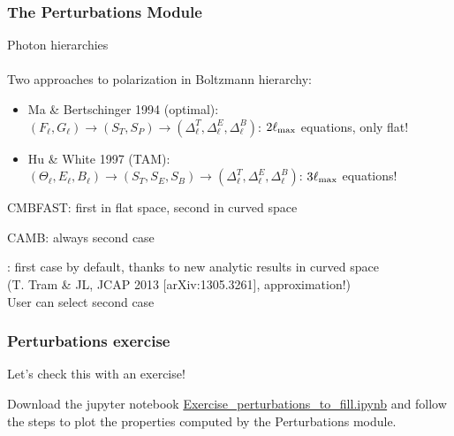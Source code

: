 \begin{frame}[fragile]
\frametitle{The Perturbations Module}

Photon hierarchies\\
\mbox{}\\
Two approaches to polarization in Boltzmann hierarchy:
\begin{itemize}
	\item Ma \& Bertschinger 1994 (optimal):\\$(F_\ell, G_\ell) \rightarrow (S_T, S_P)  \rightarrow (\Delta_\ell^T, \Delta_\ell^E, \Delta_\ell^B)$: $2 \ell_{\rm max}$ equations, only flat!
	\item Hu \& White 1997 (TAM):\\$(\Theta_\ell, E_\ell, B_\ell) \rightarrow (S_T, S_E, S_B)  \rightarrow (\Delta_\ell^T, \Delta_\ell^E, \Delta_\ell^B)$: $3 \ell_{\rm max}$ equations!
\end{itemize}

\pause
\vspace{0.2cm}

{\Red CMBFAST}: first in flat space, second in curved space\\

\pause
\vspace{0.2cm}

{\Red CAMB}: always second case\\

\pause
\vspace{0.2cm}

{\Red \CLASS{}}: first case by default, thanks to new analytic results in curved space\\ \hfill (T. Tram \& JL, JCAP 2013 [arXiv:1305.3261], approximation!) \\
User can select second case


\end{frame}

\begin{frame}[fragile]
	\frametitle{Perturbations exercise}
Let's check this with an exercise!

Download the jupyter notebook \href{https://github.com/MarkMos/class_lecture/blob/main/notebooks/Exercise_perturbations_to_fill.ipynb}{Exercise\_perturbations\_to\_fill.ipynb} and follow the steps to plot the properties computed by the Perturbations module.


\end{frame}



